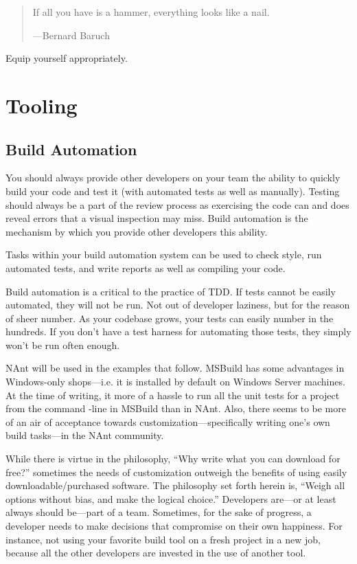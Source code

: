 \begin{quotation}
If all you have is a hammer, everything looks like a nail.

---Bernard Baruch
\end{quotation}

Equip yourself appropriately.

\section{Tooling}

\subsection{Build Automation}

You should always provide other developers on your team the ability to quickly build your code and test it (with automated tests as well as 
manually). Testing should always be a part of the review process as exercising the code can and does reveal errors that a visual inspection may 
miss. Build automation is the mechanism by which you provide other developers this ability.

Tasks within your build automation system can be used to check style, run automated tests, and write reports as well as compiling your code.

Build automation is a critical to the practice of \gls{TDD}. If tests cannot be easily automated, they will not be run. Not out of developer laziness,
but for the reason of sheer number. As your codebase grows, your tests can easily number in the hundreds. If you don't have a test harness for
automating those tests, they simply won't be run often enough.

\gls{NAnt} will be used in the examples that follow. MSBuild has some advantages in Windows-only shops---i.e. it is
installed by default on Windows Server machines. At the time of writing, it more of a hassle to run all the unit tests for a project from the command
-line in MSBuild than in NAnt. Also, there seems to be more of an air of acceptance towards customization---specifically writing one's own build 
tasks---in the NAnt community. 

While there is virtue in the philosophy, ``Why write what you can download for free?'' sometimes the needs of 
customization outweigh the benefits of using easily downloadable/purchased software. The philosophy set forth herein is, ``Weigh all options without bias, and make the
logical choice.'' Developers are---or at least always should be---part of a team. Sometimes, for the sake of progress, a developer needs to make
decisions that compromise on their own happiness. For instance, not using your favorite build tool on a fresh project in a new job, because all the
other developers are invested in the use of another tool.


